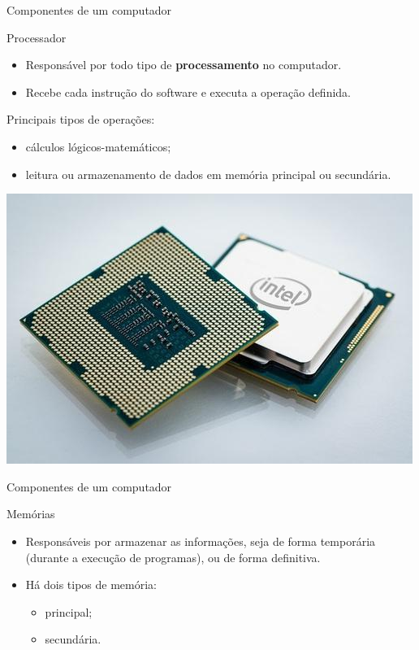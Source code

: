 \begin{frame}{Componentes de um computador}
	\begin{block}{Processador}
		\begin{itemize}
			\item Responsável por todo tipo de \textbf{processamento} no	computador.
			\item Recebe cada instrução do software e executa a operação definida.
		\end{itemize}

		Principais tipos de operações:
		\begin{itemize}
			\item cálculos lógicos-matemáticos;
			\item leitura ou armazenamento de dados em memória principal ou secundária.
		\end{itemize}
	\end{block}

	\centering
	\includegraphics[width=0.45\linewidth]{Figuras/Ch01/fig31}
\end{frame}


\begin{frame}{Componentes de um computador}
	\begin{block}{Memórias}
		\begin{itemize}
			\item Responsáveis por armazenar as informações, seja de forma temporária (durante a execução de programas), ou de forma definitiva.
			\item Há dois tipos de memória:
			      \begin{itemize}
				      \item\normalsize principal;
				      \item\normalsize secundária.
			      \end{itemize}
		\end{itemize}
	\end{block}

\end{frame}


